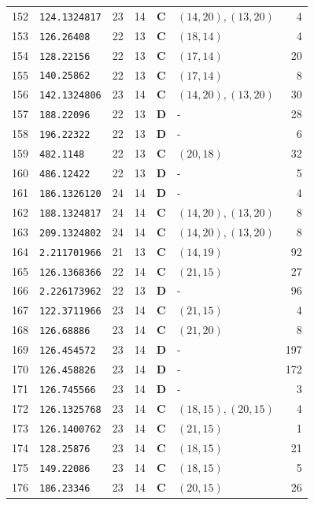 \documentclass[11pt,a4paper]{article}
\begin{document}
\begin{small}
\begin{longtable}{r l c c c l r}
152 & \texttt{124.1324817} & 23 & 14 & \textbf{C} & $(14,20), (13,20)$ & 4 \\
153 & \texttt{126.26408} & 22 & 13 & \textbf{C} & $(18,14)$ & 4 \\
154 & \texttt{128.22156} & 22 & 13 & \textbf{C} & $(17,14)$ & 20 \\
155 & \texttt{140.25862} & 22 & 13 & \textbf{C} & $(17,14)$ & 8 \\
156 & \texttt{142.1324806} & 23 & 14 & \textbf{C} & $(14,20), (13,20)$ & 30 \\
157 & \texttt{188.22096} & 22 & 13 & \textbf{D} & - & 28 \\
158 & \texttt{196.22322} & 22 & 13 & \textbf{D} & - & 6 \\
159 & \texttt{482.1148} & 22 & 13 & \textbf{C} & $(20,18)$ & 32 \\
160 & \texttt{486.12422} & 22 & 13 & \textbf{D} & - & 5 \\
161 & \texttt{186.1326120} & 24 & 14 & \textbf{D} & - & 4 \\
162 & \texttt{188.1324817} & 24 & 14 & \textbf{C} & $(14,20), (13,20)$ & 8 \\
163 & \texttt{209.1324802} & 24 & 14 & \textbf{C} & $(14,20), (13,20)$ & 8 \\
164 & \texttt{2.211701966} & 21 & 13 & \textbf{C} & $(14,19)$ & 92 \\
165 & \texttt{126.1368366} & 22 & 14 & \textbf{C} & $(21,15)$ & 27 \\
166 & \texttt{2.226173962} & 22 & 13 & \textbf{D} & - & 96 \\
167 & \texttt{122.3711966} & 23 & 14 & \textbf{C} & $(21,15)$ & 4 \\
168 & \texttt{126.68886} & 23 & 14 & \textbf{C} & $(21,20)$ & 8 \\
169 & \texttt{126.454572} & 23 & 14 & \textbf{D} & - & 197 \\
170 & \texttt{126.458826} & 23 & 14 & \textbf{D} & - & 172 \\
171 & \texttt{126.745566} & 23 & 14 & \textbf{D} & - & 3 \\
172 & \texttt{126.1325768} & 23 & 14 & \textbf{C} & $(18,15), (20,15)$ & 4 \\
173 & \texttt{126.1400762} & 23 & 14 & \textbf{C} & $(21,15)$ & 1 \\
174 & \texttt{128.25876} & 23 & 14 & \textbf{C} & $(18,15)$ & 21 \\
175 & \texttt{149.22086} & 23 & 14 & \textbf{C} & $(18,15)$ & 5 \\
176 & \texttt{186.23346} & 23 & 14 & \textbf{C} & $(20,15)$ & 26 \\

\end{longtable}
\end{small}
\end{document}

